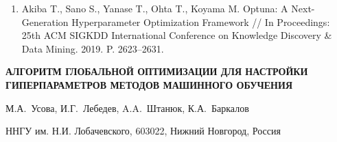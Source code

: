 \documentclass[a4paper,12pt,russian]{article}
\begin{document}
\begin{enumerate}

	

\item \label{rfa:renlit:optuna}
Akiba T., Sano S., Yanase T., Ohta T., Koyama M. Optuna: A Next-Generation Hy\-per\-pa\-ra\-me\-ter Optimization Framework // In Proceedings: 25th ACM SIGKDD International Conference on Knowledge Discovery \& Data Mining. 2019. P. 2623--2631.%


\end{enumerate}


\begin{center}
	\textbf{АЛГОРИТМ ГЛОБАЛЬНОЙ ОПТИМИЗАЦИИ ДЛЯ НАСТРОЙКИ ГИПЕРПАРАМЕТРОВ МЕТОДОВ МАШИННОГО ОБУЧЕНИЯ}
\end{center}

\begin{center}
	{М.А.~Усова, И.Г.~Лебедев, A.A.~Штанюк, К.А.~Баркалов }
\end{center}

\begin{center}
{ННГУ им. Н.И. Лобачевского, 603022, Нижний Новгород, Россия}
\end{center}
\end{document}
